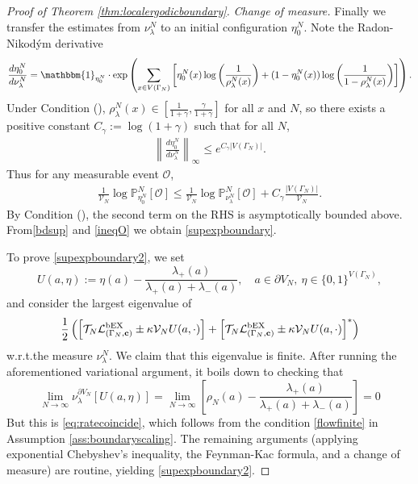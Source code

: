 \documentclass[11pt]{amsart}
\theoremstyle{plain}
\theoremstyle{definition}
\theoremstyle{remark}
\begin{document}
\begin{proof}[Proof of Theorem \ref{thm:localergodicboundary}]
\emph{Change of measure.}
Finally we transfer the estimates from $\nu_\lambda^N$ to an initial configuration $\eta_0^N$.
Note the Radon-Nikod\'ym derivative
\[
 \frac{d \eta^N_0}{d\nu_\lambda^N} =\mathbbm{1}_{\eta_0^N}\cdot\exp\left(\sum_{x\in V(\Gamma_N)} \left[\eta_0^N(x) \log\left(\frac{1}{\rho_\lambda^N(x)} \right) + (1-\eta_0^N(x))\log\left(\frac{1}{1-\rho_\lambda^N(x)}\right) \right]\right).
\]
Under Condition (), $\rho_\lambda^N(x) \in \left[\frac{1}{1+\gamma}, \frac{\gamma}{1+\gamma}\right]$ for all $x$ and $N$, so there exists a positive constant $C_\gamma := \log(1+\gamma)$ such that for all $N$,
\begin{align*}
\left\|\frac{d \eta_0^N}{d\nu_\lambda^N}\right\|_\infty \leq e^{C_\gamma |V(\Gamma_N)|}.
\end{align*}
Thus for any measurable event $\mathcal{O}$,
\begin{align}
\label{ineqO}
\frac{1}{\mathcal{V}_N} \log \mathbb{P}^N_{\eta_0^N}[\mathcal{O}] \leq \frac{1}{\mathcal{V}_N} \log\mathbb{P}^N_{\nu^N_\lambda}[\mathcal{O}] + C_\gamma \frac{|V(\Gamma_N)|}{\mathcal{V}_N}.
\end{align}
By Condition (), the second term on the RHS is asymptotically bounded above. From\eqref{bdsup} and \eqref{ineqO} we obtain \eqref{supexpboundary}.

To prove \eqref{supexpboundary2}, we set
\[
U(a,\eta) := \eta(a)-\frac{\lambda_+(a)}{\lambda_+(a)+\lambda_-(a)}, \quad a\in \partial V_N, ~\eta\in \{0,1\}^{V(\Gamma_N)},
\]
and consider the largest eigenvalue of
\[
\frac{1}{2}\left(\left[\mathcal{T}_N\mathcal{L}^{\rm bEX}_{(\Gamma_N,{\bf c})} \pm \kappa \mathcal{V}_N U(a,\cdot)\right]+\left[\mathcal{T}_N\mathcal{L}^{\rm bEX}_{(\Gamma_N,{\bf c})} \pm \kappa \mathcal{V}_N U(a,\cdot)\right]^*\right)
\]
w.r.t.\@ the measure $\nu_\lambda^N$. We claim that this eigenvalue is finite. After running the aforementioned variational argument, it boils down to checking that
\[
\lim_{N\to\infty} \nu_\lambda^{\partial V_N}[U(a,\eta)] = \lim_{N\to\infty} \left[\rho_N(a) - \frac{\lambda_+(a)}{\lambda_+(a)+\lambda_-(a)} \right]=0
\]
But this is \eqref{eq:ratecoincide}, which follows from the condition \eqref{flowfinite} in Assumption \ref{ass:boundaryscaling}. The remaining arguments (applying exponential Chebyshev's inequality, the Feynman-Kac formula, and a change of measure) are routine, yielding \eqref{supexpboundary2}.
\end{proof}
\end{document}
